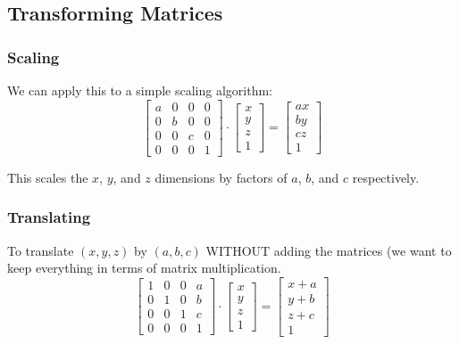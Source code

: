 \documentclass[11pt,fleqn]{article}
\theoremstyle{definition}
\begin{document}
\subsection{Transforming Matrices}

\subsubsection{Scaling}

We can apply this to a simple scaling algorithm:
\[
    \begin{bmatrix}
        a & 0 & 0 & 0 \\
        0 & b & 0 & 0 \\
        0 & 0 & c & 0 \\
        0 & 0 & 0 & 1
    \end{bmatrix} \cdot
    \begin{bmatrix}
        x \\
        y \\
        z \\
        1
    \end{bmatrix} =
    \begin{bmatrix}
        ax \\
        by \\
        cz \\
        1
    \end{bmatrix}
\]

This scales the $x$, $y$, and $z$ dimensions by factors of $a$, $b$, and $c$
respectively.

\subsubsection{Translating}

To translate $(x,y,z)$ by $(a,b,c)$ WITHOUT adding the matrices (we want to keep
everything in terms of matrix multiplication.
\[
    \begin{bmatrix}
        1 & 0 & 0 & a \\
        0 & 1 & 0 & b \\
        0 & 0 & 1 & c \\
        0 & 0 & 0 & 1
    \end{bmatrix} \cdot
    \begin{bmatrix}
        x \\
        y \\
        z \\
        1
    \end{bmatrix} =
    \begin{bmatrix}
        x + a \\
        y + b \\
        z + c \\
        1
    \end{bmatrix}
\]
\end{document}
